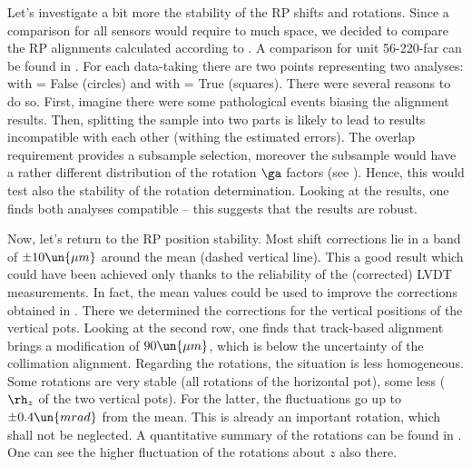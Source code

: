 
Let's investigate a bit more the stability of the RP shifts and rotations. Since a comparison for all sensors would require to much space, we decided to compare the RP alignments calculated according to . A comparison for unit 56-220-far can be found in . For each data-taking there are two points representing two analyses: with  = False (circles) and with  = True (squares). There were several reasons to do so. First, imagine there were some pathological events biasing the alignment results. Then, splitting the sample into two parts is likely to lead to results incompatible with each other (withing the estimated errors). The overlap requirement provides a subsample selection, moreover the subsample would have a rather different distribution of the rotation $\ga$ factors (see ). Hence, this would test also the stability of the rotation determination. Looking at the results, one finds both analyses compatible -- this suggests that the results are robust.

Now, let's return to the RP position stability. Most shift corrections lie in a band of $\pm 10\un{\mu m}$ around the mean (dashed vertical line). This a good result which could have been achieved only thanks to the reliability of the (corrected) LVDT measurements. In fact, the mean values could be used to improve the corrections obtained in . There we determined the corrections for the vertical positions of the vertical pots. Looking at the second row, one finds that track-based alignment brings a modification of $90\un{\mu m}$, which is below the uncertainty of the collimation alignment. Regarding the rotations, the situation is less homogeneous. Some rotations are very stable (all rotations of the horizontal pot), some less ($\rh_z$ of the two vertical pots). For the latter, the fluctuations go up to $\pm 0.4\un{mrad}$ from the mean. This is already an important rotation, which shall not be neglected. A quantitative summary of the rotations can be found in . One can see the higher fluctuation of the rotations about $z$ also there.

